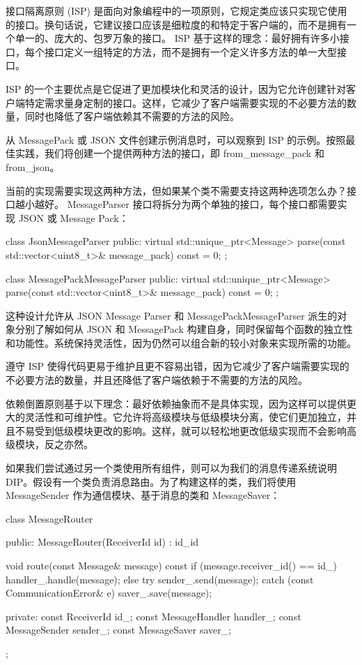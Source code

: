 接口隔离原则 (ISP) 是面向对象编程中的一项原则，它规定类应该只实现它使用的接口。换句话说，它建议接口应该是细粒度的和特定于客户端的，而不是拥有一个单一的、庞大的、包罗万象的接口。 ISP 基于这样的理念：最好拥有许多小接口，每个接口定义一组特定的方法，而不是拥有一个定义许多方法的单一大型接口。

ISP 的一个主要优点是它促进了更加模块化和灵活的设计，因为它允许创建针对客户端特定需求量身定制的接口。这样，它减少了客户端需要实现的不必要方法的数量，同时也降低了客户端依赖其不需要的方法的风险。

从 MessagePack 或 JSON 文件创建示例消息时，可以观察到 ISP 的示例。按照最佳实践，我们将创建一个提供两种方法的接口，即 from\_message\_pack 和 from\_json。

当前的实现需要实现这两种方法，但如果某个类不需要支持这两种选项怎么办？接口越小越好。 MessageParser 接口将拆分为两个单独的接口，每个接口都需要实现 JSON 或 Message Pack：

\begin{cpp}
class JsonMessageParser {
public:
    virtual std::unique_ptr<Message>
    parse(const std::vector<uint8_t>& message_pack)
        const = 0;
};

class MessagePackMessageParser {
public:
    virtual std::unique_ptr<Message>
    parse(const std::vector<uint8_t>& message_pack)
        const = 0;
};
\end{cpp}

这种设计允许从 JSON Message Parser 和 MessagePackMessageParser 派生的对象分别了解如何从 JSON 和 MessagePack 构建自身，同时保留每个函数的独立性和功能性。系统保持灵活性，因为仍然可以组合新的较小对象来实现所需的功能。

遵守 ISP 使得代码更易于维护且更不容易出错，因为它减少了客户端需要实现的不必要方法的数量，并且还降低了客户端依赖于不需要的方法的风险。


依赖倒置原则基于以下理念：最好依赖抽象而不是具体实现，因为这样可以提供更大的灵活性和可维护性。它允许将高级模块与低级模块分离，使它们更加独立，并且不易受到低级模块更改的影响。这样，就可以轻松地更改低级实现而不会影响高级模块，反之亦然。

如果我们尝试通过另一个类使用所有组件，则可以为我们的消息传递系统说明 DIP。假设有一个类负责消息路由。为了构建这样的类，我们将使用 MessageSender 作为通信模块、基于消息的类和 MessageSaver：

\begin{cpp}
class MessageRouter {
public:
    MessageRouter(ReceiverId id)
        : id_{id} {}

    void route(const Message& message) const {
        if (message.receiver_id() == id_) {
            handler_.handle(message);
        } else {
            try {
                sender_.send(message);
            } catch (const CommunicationError& e) {
                saver_.save(message);
            }
        }
    }

private:
    const ReceiverId id_;
    const MessageHandler handler_;
    const MessageSender sender_;
    const MessageSaver saver_;
};
\end{cpp}

